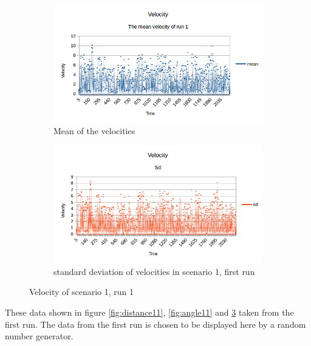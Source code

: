 \begin{figure}[H]
    \centering
    \begin{subfigure}[b]{0.4\textwidth}
        \centering
        \includegraphics[width=\textwidth]{figs/scenario1_run1/velmean}
        \caption{Mean of the velocities}
        \label{fig:velmean1_1}
    \end{subfigure}
    \hfill
    \begin{subfigure}[b]{0.4\textwidth}
        \centering
        \includegraphics[width=\textwidth]{figs/scenario1_run1/velsd}
        \caption{standard deviation of velocities in scenario 1, first run}
        \label{fig:velsd1_1}
    \end{subfigure}
    \caption[Velocity]{Velocity of scenario 1, run 1}
    \label{fig:vel11}
\end{figure}
These data shown in figure \ref{fig:distance11}, \ref{fig:angle11} and \ref{fig:vel11} taken from the first run. The data from the first run is chosen to be displayed here by a random number generator.






